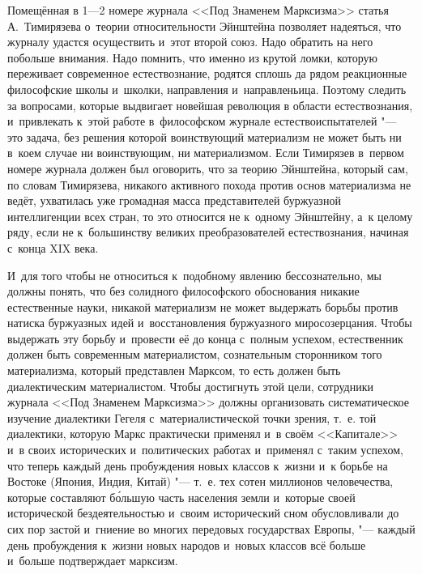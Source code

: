 Помещённая в 1---2 номере журнала <<Под Знаменем Марксизма>> статья
А.~Тимирязева о~теории относительности Эйнштейна позволяет
надеяться, что журналу удастся осуществить и~этот второй союз. Надо
обратить на него побольше внимания. Надо помнить, что именно из крутой
ломки, которую переживает современное естествознание, родятся сплошь да
рядом реакционные философские школы и~школки, направления и~направленьица.
Поэтому следить за вопросами, которые выдвигает новейшая революция в
области естествознания, и~привлекать к~этой работе в~философском журнале
естествоиспытателей "--- это задача, без решения которой воинствующий
материализм не может быть ни в~коем случае ни воинствующим, ни
материализмом. Если Тимирязев в~первом номере журнала должен был оговорить,
что за теорию Эйнштейна, который сам, по словам Тимирязева, никакого
активного похода против основ материализма не ведёт, ухватилась уже
громадная масса представителей буржуазной интеллигенции всех стран, то это
относится не к~одному Эйнштейну, а~к целому ряду, если не к~большинству
великих преобразователей естествознания, начиная с~конца XIX века.

И~для того чтобы не относиться к~подобному явлению бессознательно, мы
должны понять, что без солидного философского обоснования никакие
естественные науки, никакой материализм не может выдержать борьбы против
натиска буржуазных идей и~восстановления буржуазного миросозерцания. Чтобы
выдержать эту борьбу и~провести её до конца с~полным успехом, естественник
должен быть современным материалистом, сознательным сторонником того
материализма, который представлен Марксом, то есть должен быть
диалектическим материалистом. Чтобы достигнуть этой цели, сотрудники
журнала <<Под Знаменем Марксизма>> должны организовать систематическое
изучение диалектики Гегеля с~материалистической точки зрения, т.~е. той
диалектики, которую Маркс практически применял и~в своём <<Капитале>> и~в
своих исторических и~политических работах и~применял с~таким успехом, что
теперь каждый день пробуждения новых классов к~жизни и~к борьбе на Востоке
(Япония, Индия, Китай) "--- т.~е. тех сотен миллионов человечества, которые
составляют б\'{о}льшую часть населения земли и~которые своей исторической
бездеятельностью и~своим исторический сном обусловливали до сих пор застой
и~гниение во многих передовых государствах Европы, "--- каждый день
пробуждения к~жизни новых народов и~новых классов всё больше и~больше
подтверждает марксизм.

